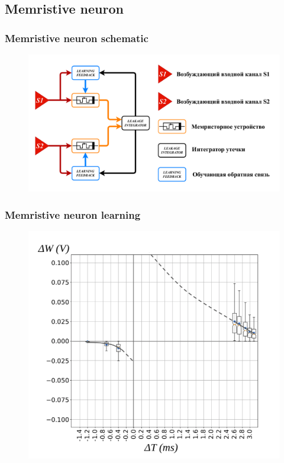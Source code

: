 \documentclass[12pt, aspectratio=169]{beamer}
\begin{document}
\subsection{Memristive neuron}
\begin{frame}
  \frametitle{Memristive neuron schematic}
  \begin{figure}
    \includegraphics[width=0.8\linewidth]{common_block_diag_of_mem_neuron}
  \end{figure}
\end{frame}
\begin{frame}
  \frametitle{Memristive neuron learning}
  \begin{figure}
    \includegraphics[width=0.6\linewidth]{111}
  \end{figure}
\end{frame}
\end{document}
